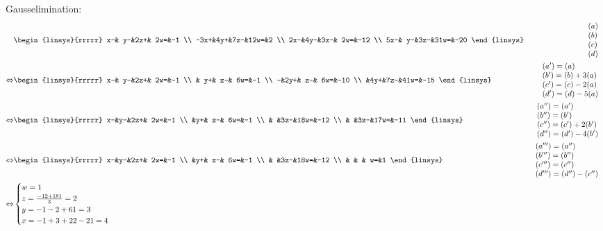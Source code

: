 \begin{task}{1.7}
	Gausselimination:
	\begin{align*}
		&\begin{linsys}{rrrrr}
			  x-& y-&2z+& 2w=&-1 \\
			-3x+&4y+&7z-&12w=&2 \\
			 2x-&4y-&3z-& 2w=&-12 \\
			 5x-& y-&3z-&31w=&-20
		\end{linsys}
		&\begin{array}{l} 
			(a) \\ 
			(b) \\
			(c) \\
			(d)
		\end{array} \\ \lra
		&\begin{linsys}{rrrrr}
			x-& y-&2z+& 2w=&-1 \\
			  & y+& z-& 6w=&-1 \\
			 -&2y+& z-& 6w=&-10 \\
			  &4y+&7z-&41w=&-15
		\end{linsys}
		&\begin{array}{l} 
			(a')=(a) \\ 
			(b')=(b)+3(a) \\
			(c')=(c)-2(a) \\
			(d')=(d)-5(a)
		\end{array} \\ \lra
		&\begin{linsys}{rrrrr}
			x-&y-&2z+& 2w=&-1 \\
			  &y+& z-& 6w=&-1 \\
			  &  &3z-&18w=&-12 \\
			  &  &3z-&17w=&-11
		\end{linsys}
		&\begin{array}{l} 
			(a'')=(a') \\ 
			(b'')=(b') \\
			(c'')=(c')+2(b') \\
			(d'')=(d')-4(b')
		\end{array} \\ \lra
		&\begin{linsys}{rrrrr}
			x-&y-&2z+& 2w=&-1 \\
			  &y+& z-& 6w=&-1 \\
			  &  &3z-&18w=&-12 \\
			  &  &   &  w=&1
		\end{linsys}
		&\begin{array}{l} 
			(a''')=(a'') \\ 
			(b''')=(b'') \\
			(c''')=(c'') \\
			(d''')=(d'')-(c'')
		\end{array} \\ \lra
		&\begin{cases}
			w=1 \\
			z=\frac{-12+18\*1}{3}=2 \\
			y=-1-2+6\*1=3\\
			x=-1+3+2\*2-2\*1=4
		\end{cases}
	\end{align*}
	

\end{task}
